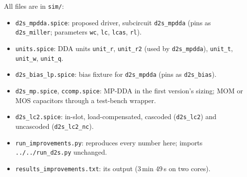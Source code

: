 \documentclass[journal]{IEEEtran}
\newcommand{\cell}[1]{\texttt{#1}}
\begin{document}
\appendix[Files]
All files are in \cell{sim/}:
\begin{itemize}
\item \cell{d2s\_mpdda.spice}: proposed driver, subcircuit \cell{d2s\_mpdda} (pins as
\cell{d2s\_miller}; parameters \cell{wc}, \cell{lc}, \cell{lcas}, \cell{rl}).
\item \cell{units.spice}: DDA units \cell{unit\_r}, \cell{unit\_r2} (used by
\cell{d2s\_mpdda}), \cell{unit\_t}, \cell{unit\_w}, \cell{unit\_q}.
\item \cell{d2s\_bias\_lp.spice}: bias fixture for \cell{d2s\_mpdda} (pins as
\cell{d2s\_bias}).
\item \cell{d2s\_mp.spice}, \cell{ccomp.spice}: MP-DDA in the first version's sizing; MOM or
MOS capacitors through a test-bench wrapper.
\item \cell{d2s\_lc2.spice}: in-slot, load-compensated, cascoded (\cell{d2s\_lc2}) and
uncascoded (\cell{d2s\_lc2\_nc}).
\item \cell{run\_improvements.py}: reproduces every number here; imports
\cell{../../run\_d2s.py} unchanged.
\item \cell{results\_improvements.txt}: its output (3\,min 49\,s on two cores).
\end{itemize}
\end{document}
